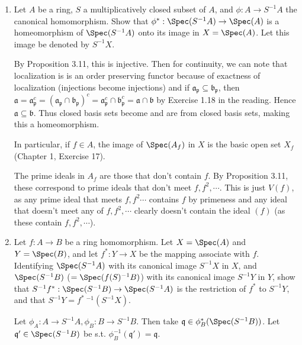 \documentclass[a4paper]{exam}
\begin{document}
\begin{questions}
\question 
\begin{enumerate}
\item Let $A $ be a ring, $S $ a multiplicatively closed subset of $A $, and $\phi : A \to S^{-1}A $ the canonical homomorphism. Show that $\phi^\ast: \Spec(S^{-1}A) \to \Spec(A) $ is a homeomorphism of $\Spec(S^{-1}A) $ onto its image in $X = \Spec(A) $. Let this image be denoted by $S^{-1}X $.\\
\begin{solution}
	By Proposition 3.11, this is injective.
	Then for continuity, we can note that localization is is an order preserving functor because of exactness of localization (injections become injections) and if $\mathfrak{a}_{\mathfrak{p}} \subseteq \mathfrak{b}_{\mathfrak{p}} $, then $\mathfrak{a} = \mathfrak{a}_{\mathfrak{p}}^c = (\mathfrak{a}_{\mathfrak{p}}\cap \mathfrak{b}_{\mathfrak{p}})^c = \mathfrak{a}_{\mathfrak{p}}^c \cap \mathfrak{b}_{\mathfrak{p}}^c = \mathfrak{a} \cap \mathfrak{b}$ by Exercise 1.18 in the reading.
	Hence $\mathfrak{a} \subseteq \mathfrak{b} $.
	Thus closed basis sets become and are from closed basis sets, making this a homeomorphism.
\end{solution}
In particular, if $f\in A $, the image of $\Spec(A_f) $ in $X $ is the basic open set $X_f $ (Chapter 1, Exercise 17).
\begin{solution}
	The prime ideals in $A_f $ are those that don't contain $f $.
	By Proposition 3.11, these correspond to prime ideals that don't meet $f,f^2,\cdots $.
	This is just $V(f) $, as any prime ideal that meets $f,f^2\cdots $ contains $f $ by primeness and any ideal that doesn't meet any of $f,f^2,\cdots $ clearly doesn't contain the ideal $(f) $ (as these contain $f,f^2,\cdots $).
\end{solution}

\item Let $f:A\to B $ be a ring homomorphism. Let $X = \Spec(A) $ and $Y = \Spec(B) $, and let $f^\ast:Y \to X $ be the mapping associate with $f $. Identifying $\Spec(S^{-1}A) $ with its canonical image $S^{-1}X $ in $X $, and $\Spec(S^{-1}B) $ ($= \Spec(f(S)^{-1}B) $) with its canonical image $S^{-1}Y $ in $Y$, show that $S^{-1}f^\ast: \Spec(S^{-1}B) \to \Spec(S^{-1}A) $ is the restriction of $f^\ast $ to $S^{-1}Y $, and that $S^{-1}Y = f^\ast\ ^{-1}(S^{-1}X)$.
\begin{solution}
	Let $\phi_{A}: A\to S^{-1}A, \phi_{B}: B\to S^{-1}B $.
	Then take $\mathfrak{q} \in \phi_B^\ast(\Spec(S^{-1}B))$.
	Let $\mathfrak{q}'\in \Spec(S^{-1}B)$ be s.t. $\phi_B^{-1}(\mathfrak{q}') = \mathfrak{q}$.


\end{solution}
\end{enumerate}
\end{questions}
\end{document}
